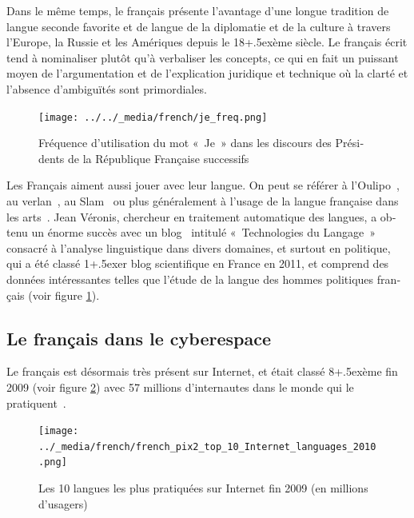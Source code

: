 \begin{french}
\begin{multicols}{2}
Dans le même temps, le français présente l'avantage d'une
longue tradition de langue seconde favorite et de langue de la
diplomatie et de la culture à travers l'Europe, la Russie et
les Amériques depuis le 18\raise+.5ex\hbox{ème} siècle. Le français
écrit tend à nominaliser plutôt qu'à verbaliser les concepts,
ce qui en fait un puissant moyen de l'argumentation et de
l'explication juridique et technique où la clarté et l'absence d'ambiguïtés sont primordiales.
%
\begin{figure}[t]
\begin{center}
 \texttt{[image: ../../\_media/french/je\_freq.png]} 
  \caption{Fréquence d'utilisation du mot «~Je~» dans les discours des Présidents de la République Française successifs}
  \label{fig:je_stats}
\end{center}
\end{figure}
%
Les Français aiment aussi jouer avec leur langue. On peut se référer à
l'Oulipo~\cite{oulipo}, au verlan~\cite{plenat95}, au
Slam~\cite{slam} ou plus généralement à l'usage de la langue
française dans les arts~\cite{arts}. Jean Véronis, chercheur en
traitement automatique des langues, a obtenu un énorme succès avec un
blog~\cite{veronis} intitulé «~Technologies du Langage~» consacré à
l'analyse linguistique dans divers domaines, et surtout en
politique, qui a été classé 1\raise+.5ex\hbox{er} blog scientifique en
France en 2011, et comprend des données intéressantes telles que
l'étude de la langue des hommes politiques français (voir
figure \ref{fig:je_stats}).



\subsection{Le français dans le cyberespace}

Le français est désormais très présent sur Internet, et était classé
8\raise+.5ex\hbox{ème} fin 2009 (voir figure \ref{fig:internettop10})
avec 57 millions d'internautes dans le monde qui le pratiquent~\cite{internettop10}.
%
\begin{figure}[t]
\begin{center}
 \texttt{[image: ../\_media/french/french\_pix2\_top\_10\_Internet\_languages\_2010.png]}
  \caption{Les 10 langues les plus pratiquées sur Internet fin 2009 (en millions d'usagers)~\cite{internettop10}}
  \label{fig:internettop10}
\end{center}
\end{figure}


\end{multicols}
\end{french}
